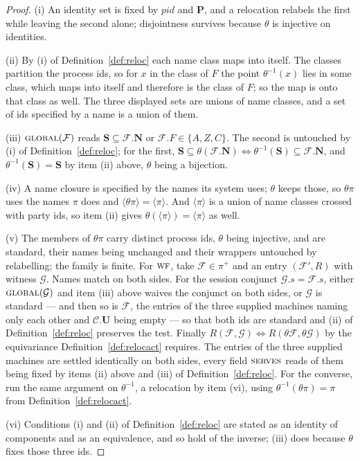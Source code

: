 \documentclass[11pt,a4paper]{article}
\newcommand{\Ps}{\mathbf{P}}
\newcommand{\PID}{\mathit{pid}}
\newcommand{\admits}{\mathbf{N}}
\newcommand{\Spid}{\mathbf{S}}
\newcommand{\uses}{\mathbf{U}}
\newcommand{\serves}{\op{serves}}
\newcommand{\WF}{\op{wf}}
\newcommand{\Corr}{\mathcal{C}}
\newcommand{\F}{\mathcal{F}}
\newcommand{\G}{\mathcal{G}}
\newcommand{\op}[1]{\textsc{#1}}
\newcommand{\ncl}[1]{\langle #1 \rangle}
\theoremstyle{accentdef}
\theoremstyle{accentplain}
\begin{document}
\begin{proof}
(i) An identity set is fixed by $\PID$ and $\Ps$, and a relocation relabels the first while leaving
the second alone; disjointness survives because $\theta$ is injective on identities.

(ii) By (i) of Definition~\ref{def:reloc} each name class maps into itself. The classes partition the
process ids, so for $x$ in the class of $F$ the point $\theta^{-1}(x)$ lies in some class, which maps
into itself and therefore is the class of $F$; so the map is onto that class as well. The three
displayed sets are unions of name classes, and a set of ids specified by a name is a union of them.

(iii) $\op{global}(\F)$ reads $\Spid \subseteq \F.\admits$ or $\F.F \in \{A,Z,C\}$. The second is
untouched by (i) of Definition~\ref{def:reloc}; for the first,
$\Spid \subseteq \theta(\F.\admits) \iff \theta^{-1}(\Spid) \subseteq \F.\admits$, and
$\theta^{-1}(\Spid) = \Spid$ by item (ii) above, $\theta$ being a bijection.

(iv) A name closure is specified by the names its system uses; $\theta$ keeps those, so $\theta\pi$
uses the names $\pi$ does and $\ncl{\theta\pi} = \ncl{\pi}$. And $\ncl{\pi}$ is a union of name
classes crossed with party ids, so item (ii) gives $\theta(\ncl{\pi}) = \ncl{\pi}$ as well.

(v) The members of $\theta\pi$ carry distinct process ids, $\theta$ being injective, and are
standard, their names being unchanged and their wrappers untouched by relabelling; the family is
finite. For $\WF$, take $\F \in \pi^{+}$ and an entry $(\F',R)$ with witness $\G$. Names match on
both sides. For the session conjunct $\G.s = \F.s$, either $\op{global}(\G)$ and item (iii) above
waives the conjunct on both sides, or $\G$ is standard --- and then so is $\F$, the entries of the
three supplied machines naming only each other and $\Corr.\uses$ being empty --- so that both ids are
standard and (ii) of Definition~\ref{def:reloc} preserves the test. Finally
$R(\F,\G) \iff R(\theta\F,\theta\G)$ by the equivariance
Definition~\ref{def:relocact} requires. The entries of the
three supplied machines are settled identically on both sides, every field $\serves$ reads of them
being fixed by items (ii) above and (iii) of Definition~\ref{def:reloc}. For the converse, run the
same argument on $\theta^{-1}$, a relocation by item (vi), using
$\theta^{-1}(\theta\pi) = \pi$ from Definition~\ref{def:relocact}.

(vi) Conditions (i) and (ii) of Definition~\ref{def:reloc} are stated as an identity of components and
as an equivalence, and so hold of the inverse; (iii) does because $\theta$ fixes those three ids.
\end{proof}
\end{document}
